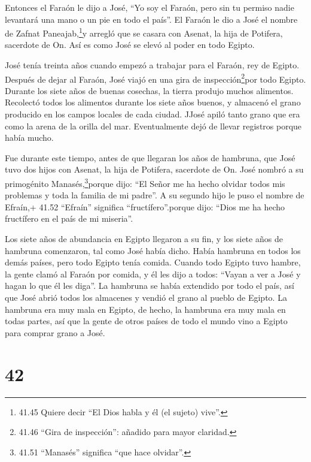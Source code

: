  Entonces el Faraón le dijo a José, ``Yo soy el Faraón,
pero sin tu permiso nadie levantará una mano o un pie en todo el país''.
 El Faraón le dio a José el nombre de Zafnat
Paneajab,\footnote{41.45 Quiere decir ``El Dios habla y él (el sujeto)
  vive''.}y arregló que se casara con Asenat, la hija de Potifera,
sacerdote de On. Así es como José se elevó al poder en todo Egipto.

 José tenía treinta años cuando empezó a trabajar para el
Faraón, rey de Egipto. Después de dejar al Faraón, José viajó en una
gira de inspección\footnote{41.46 ``Gira de inspección'': añadido para
  mayor claridad.}por todo Egipto.  Durante los siete años
de buenas cosechas, la tierra produjo muchos alimentos. 
Recolectó todos los alimentos durante los siete años buenos, y almacenó
el grano producido en los campos locales de cada ciudad. 
JJosé apiló tanto grano que era como la arena de la orilla del mar.
Eventualmente dejó de llevar registros porque había mucho.

 Fue durante este tiempo, antes de que llegaran los años de
hambruna, que José tuvo dos hijos con Asenat, la hija de Potifera,
sacerdote de On.  José nombró a su primogénito
Manasés,\footnote{41.51 ``Manasés'' significa ``que hace olvidar''.}porque
dijo: ``El Señor me ha hecho olvidar todos mis problemas y toda la
familia de mi padre''.  A su segundo hijo le puso el nombre
de Efraín,+ 41.52 ``Efraín'' significa ``fructífero''.porque dijo:
``Dios me ha hecho fructífero en el país de mi miseria''.

 Los siete años de abundancia en Egipto llegaron a su fin,
 y los siete años de hambruna comenzaron, tal como José
había dicho. Había hambruna en todos los demás países, pero todo Egipto
tenía comida.  Cuando todo Egipto tuvo hambre, la gente
clamó al Faraón por comida, y él les dijo a todos: ``Vayan a ver a José
y hagan lo que él les diga''.  La hambruna se había
extendido por todo el país, así que José abrió todos los almacenes y
vendió el grano al pueblo de Egipto. La hambruna era muy mala en Egipto,
 de hecho, la hambruna era muy mala en todas partes, así
que la gente de otros países de todo el mundo vino a Egipto para comprar
grano a José.

\hypertarget{section-41}{%
\section{42}\label{section-41}}

